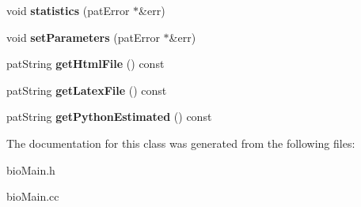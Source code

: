 \begin{DoxyCompactItemize}
\mbox{\label{classbio_main_ae1a93bda498636ac17c0c9818968d2d8}} 
void {\bfseries statistics} (pat\+Error $\ast$\&err)
\item 
\mbox{\label{classbio_main_adcb5675f4f9f4725916fa612fe8c4228}} 
void {\bfseries set\+Parameters} (pat\+Error $\ast$\&err)
\item 
\mbox{\label{classbio_main_a945260b09803966598401cad8c2bda69}} 
pat\+String {\bfseries get\+Html\+File} () const
\item 
\mbox{\label{classbio_main_a8c690fc76b7e6e9b738b5b479a32c73d}} 
pat\+String {\bfseries get\+Latex\+File} () const
\item 
\mbox{\label{classbio_main_a4cb65cfad0b93d1cc78c72a33f1f8d88}} 
pat\+String {\bfseries get\+Python\+Estimated} () const
\end{DoxyCompactItemize}


The documentation for this class was generated from the following files\+:\begin{DoxyCompactItemize}
\item 
bio\+Main.\+h\item 
bio\+Main.\+cc\end{DoxyCompactItemize}
